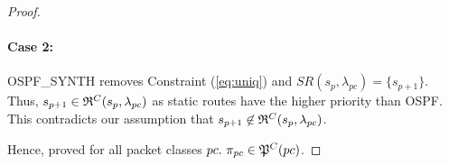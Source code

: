 \begin{proof}
\paragraph{Case 2:}  
{\small \sc OSPF_SYNTH} removes Constraint (\ref{eq:uniq}) 
and $SR(s_p, \lambda_{pc}) = \{s_{p+1}\}$. 
Thus, $s_{p+1} \in \mathfrak{R}^C(s_{p}, \lambda_{pc})$ as static routes 
have the higher priority than OSPF. This contradicts our assumption
that $s_{p+1} \not\in \mathfrak{R}^C(s_{p}, \lambda_{pc})$. 

Hence, proved for all packet classes 
$pc. ~\pi_{pc} \in \mathfrak{P}^C(pc)$.
\end{proof}